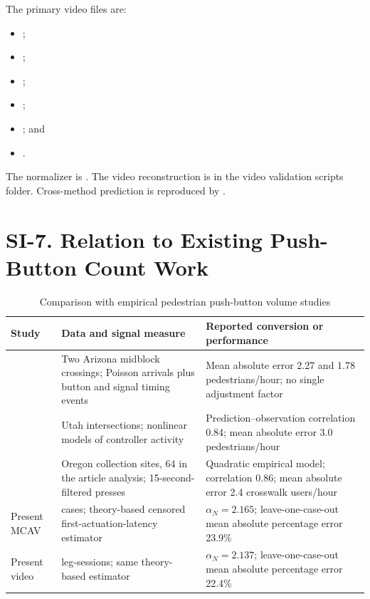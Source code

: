 \documentclass[11pt]{article}
\begin{document}
The primary video files are:
\begin{itemize}
  \item {};
  \item {};
  \item {};
  \item {};
  \item {}; and
  \item {}.
\end{itemize}

The normalizer is . The video reconstruction is in the video validation scripts folder. Cross-method prediction is reproduced by .

\section*{SI-7. Relation to Existing Push-Button Count Work}

\begin{table}[htbp]
\centering
\caption{Comparison with empirical pedestrian push-button volume studies}
\label{tab:literature-comparison}
\footnotesize
\setlength{\tabcolsep}{4pt}
\begin{tabular}{@{}>{\raggedright\arraybackslash}p{}>{\raggedright\arraybackslash}p{}>{\raggedright\arraybackslash}p{}@{}}
\toprule
Study & Data and signal measure & Reported conversion or performance \\
\midrule
\citet{liWu2021midblockVolume} & Two Arizona midblock crossings; Poisson arrivals plus button and signal timing events & Mean absolute error 2.27 and 1.78 pedestrians/hour; no single adjustment factor \\
\citet{singleton2021pedestrianSignalCounts} & 90 Utah intersections; nonlinear models of controller activity & Prediction--observation correlation 0.84; mean absolute error 3.0 pedestrians/hour \\
\citet{kothuri2024activeTransportationCounts,saheli2026pedestrianVolumes} & 65 Oregon collection sites, 64 in the article analysis; 15-second-filtered presses & Quadratic empirical model; correlation 0.86; mean absolute error 2.4 crosswalk users/hour \\
Present MCAV & 14 cases; theory-based censored first-actuation-latency estimator & \(\alpha_N=2.165\); leave-one-case-out mean absolute percentage error 23.9\% \\
Present video & 24 leg-sessions; same theory-based estimator & \(\alpha_N=2.137\); leave-one-case-out mean absolute percentage error 22.4\% \\
\bottomrule
\end{tabular}
\end{table}
\end{document}
